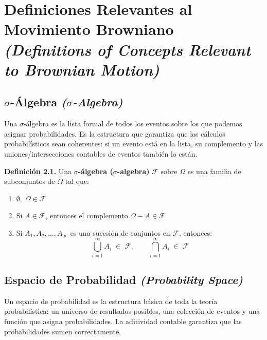 \documentclass[12pt]{article}
\begin{document}
\section{Definiciones Relevantes al Movimiento Browniano
\textit{(Definitions of Concepts Relevant to Brownian Motion)}}

\subsection{$\sigma$-\'Algebra \textit{($\sigma$-Algebra)}}

\begin{intuicion}
Una $\sigma$-\'algebra es la lista formal de todos los eventos sobre los que podemos asignar probabilidades. Es la estructura que garantiza que los c\'alculos probabil\'isticos sean coherentes: si un evento est\'a en la lista, su complemento y las uniones/intersecciones contables de eventos tambi\'en lo est\'an.
\end{intuicion}

\textbf{Definici\'on 2.1.} Una \textbf{$\sigma$-\'algebra ($\sigma$-algebra)} $\mathcal{F}$ sobre $\Omega$ es una familia de subconjuntos de $\Omega$ tal que:
\begin{enumerate}
  \item $\emptyset,\;\Omega \in \mathcal{F}$
  \item Si $A \in \mathcal{F}$, entonces el complemento $\Omega - A \in \mathcal{F}$
  \item Si $A_1, A_2, \ldots, A_\infty$ es una sucesi\'on de conjuntos en $\mathcal{F}$, entonces:
  \[
    \bigcup_{i=1}^{\infty} A_i \;\in\; \mathcal{F}, \qquad
    \bigcap_{i=1}^{\infty} A_i \;\in\; \mathcal{F}
  \]
\end{enumerate}

\subsection{Espacio de Probabilidad \textit{(Probability Space)}}

\begin{intuicion}
Un espacio de probabilidad es la estructura b\'asica de toda la teor\'ia probabil\'istica: un universo de resultados posibles, una colecci\'on de eventos y una funci\'on que asigna probabilidades. La aditividad contable garantiza que las probabilidades sumen correctamente.
\end{intuicion}
\end{document}
